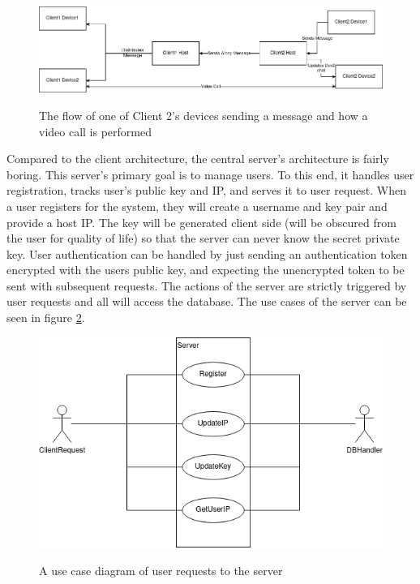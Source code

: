 \documentclass[titlepage]{article}
\begin{document}
    \begin{center}
        \begin{figure}[!ht]
            \includegraphics[scale=.5]{graphics/clientHost.png}
            \label{clientHost}
            \caption{The flow of one of Client 2's devices sending a message and how a video call is performed}
        \end{figure}
    \end{center}

    Compared to the client architecture, the central server's architecture is fairly boring.
    This server's primary goal is to manage users.
    To this end, it handles user registration, tracks user's public key and IP, and serves it to user request.
    When a user registers for the system, they will create a username and key pair and provide a host IP.
    The key will be generated client side (will be obscured from the user for quality of life) so that the server can never know the secret private key.
    User authentication can be handled by just sending an authentication token encrypted with the users public key, and expecting the unencrypted token to be sent with subsequent requests.
    The actions of the server are strictly triggered by user requests and all will access the database.
    The use cases of the server can be seen in figure \ref{serverUse}.

    \begin{center}
        \begin{figure}[!ht]
            \includegraphics[scale=.5]{graphics/ServerUseCase.png}
            \label{serverUse}
            \caption{A use case diagram of user requests to the server}
        \end{figure}
    \end{center}
\end{document}
